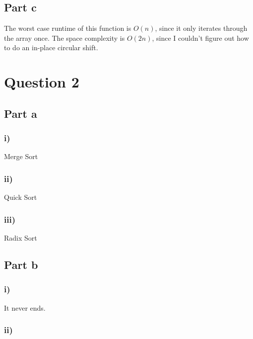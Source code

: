 \documentclass{article}
\begin{document}
\subsection*{Part c}



The worst case runtime of this function is $O(n)$, since it only iterates
through the array once. The space complexity is $O(2n)$, since I couldn't figure
out how to do an in-place circular shift.

\section*{Question 2}

\subsection*{Part a}

\subsubsection*{i)}

Merge Sort

\subsubsection*{ii)}

Quick Sort

\subsubsection*{iii)}

Radix Sort

\subsection*{Part b}

\subsubsection*{i)}

It never ends.

\subsubsection*{ii)}
\end{document}
